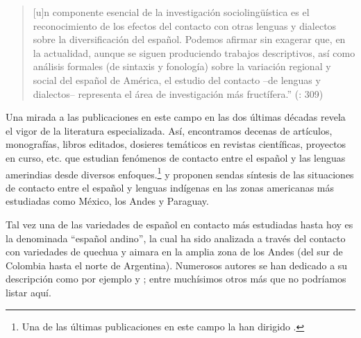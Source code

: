 \documentclass[output=paper]{langscibook}
\begin{document}
\begin{quote}
[u]n componente esencial de la investigación sociolingüística es el reconocimiento de los efectos del contacto con otras lenguas y dialectos sobre la diversificación del español. Podemos afirmar sin exagerar que, en la actualidad, aunque se siguen produciendo trabajos descriptivos, así como análisis formales (de sintaxis y fonología) sobre la variación regional y social del español de América, el estudio del contacto –de lenguas y dialectos– representa el área de investigación más fructífera.” (\citeyear{Lipski2007}: 309)
\end{quote}

Una mirada a las publicaciones en este campo en las dos últimas décadas revela el vigor de la literatura especializada. Así, encontramos decenas de artículos, monografías, libros editados, dosieres temáticos en revistas científicas, proyectos en curso, etc. que estudian fenómenos de contacto entre el español y las lenguas amerindias desde diversos enfoques.\footnote{Una de las últimas publicaciones en este campo la han dirigido  \citet{BlestelPalaciosAlcaine2021}.} \citet{KleeLynch2009indigenas} y \citet{Escobar2012} proponen sendas síntesis de las situaciones de contacto entre el español y lenguas indígenas en las zonas americanas más estudiadas como México, los Andes y Paraguay.

Tal vez una de las variedades de español en contacto más estudiadas hasta hoy es la denominada “español andino”, la cual ha sido analizada a través del contacto con variedades de quechua y aimara en la amplia zona de los Andes (del sur de Colombia hasta el norte de Argentina). Numerosos autores se han dedicado a su descripción como por ejemplo
\citet{KleeCaravedo2006,CaravedoKlee2012,PfänderPalaciosAlcaine2013,PalaciosAlcainePfänder2018,Muntendam2008,Muntendam2013,Muysken1984,Muysken2005,MartínezLópez2012,MartínezLópez2017,Olbertz2005,Olbertz2008,Haboud1998,Haboud2005,Cerrón-Palomino2003,DeGranda1992,MermaMolina2008,ArboledaToro2003,GarcíaTesoro2013,GarcíaTesoro2015,Babel2009,Babel2014stereotypes,GómezRendón2008} y \citet{SánchezMoreano2017,SánchezMoreano2019}; entre muchísimos otros más que no podríamos listar aquí.
\end{document}
